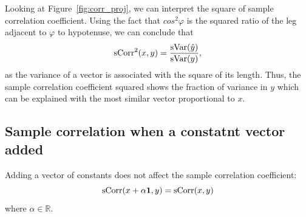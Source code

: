 Looking at Figure~\ref{fig:corr_proj}, we can interpret the square of sample correlation coefficient.
Using the fact that $cos^2 \varphi$ is the squared ratio of the leg adjacent to $\varphi$ to hypotenuse, we can conclude that
\[
\operatorname{sCorr}^2(x,y) = \frac{\operatorname{sVar}(\hat y)}{\operatorname{sVar}(y)},
\]
as the variance of a vector is associated with the square of its length.
Thus, the sample correlation coefficient squared shows the fraction of variance in $y$ which can be explained
with the most similar vector proportional to $x$.


\subsection{Sample correlation when a constatnt vector added}


\begin{theorem}
Adding a vector of constants does not affect the sample correlation coefficient:
\[
\operatorname{sCorr}(x + \alpha \mathbf{1}, y) = \operatorname{sCorr}(x,y)
\]
where $\alpha \in \mathbb{R}$.
\end{theorem}

